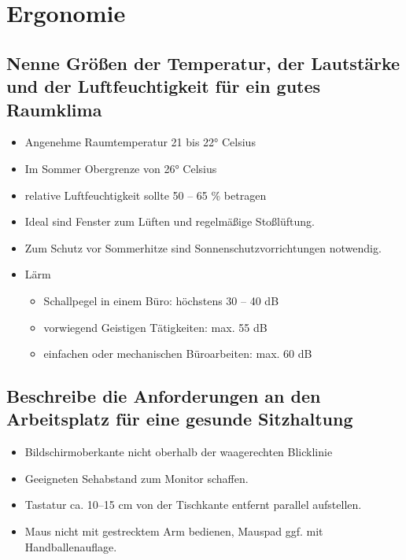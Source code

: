\documentclass[a4paper]{article}
\begin{document}
    \section{Ergonomie}\label{sec:ergonomie}

    \subsection{\color{red}Nenne Größen der Temperatur, der Lautstärke und der Luftfeuchtigkeit für ein gutes Raumklima}\label{subsec:nenne-größen-der-temperatur-der-lautstärke-und-der-luftfeuchtigkeit-für-ein-gutes-raumklima}
    \begin{itemize}
        \color{magenta}
        \item Angenehme Raumtemperatur 21 bis 22° Celsius
        \item Im Sommer Obergrenze von 26° Celsius
        \item relative Luftfeuchtigkeit sollte 50 – 65 \% betragen
        \item Ideal sind Fenster zum Lüften und regelmäßige Stoßlüftung.
        \item Zum Schutz vor Sommerhitze sind Sonnenschutzvorrichtungen notwendig.
        \item \color[HTML]{F56B00} Lärm
        \begin{itemize}
            \item Schallpegel in einem Büro: höchstens 30 – 40 dB
            \item vorwiegend Geistigen Tätigkeiten: max.
            55 dB
            \item einfachen oder mechanischen Büroarbeiten: max.
            60 dB
        \end{itemize}
    \end{itemize}

    \subsection{\color{red}Beschreibe die Anforderungen an den Arbeitsplatz für eine gesunde Sitzhaltung}\label{subsec:beschreibe-die-anforderungen-an-den-arbeitsplatz-für-eine-gesunde-sitzhaltung}
    \begin{itemize}
        \color{magenta}
        \item Bildschirmoberkante nicht oberhalb
        der waagerechten Blicklinie
        \item Geeigneten Sehabstand zum
        Monitor schaffen.
        \item Tastatur ca.
        10--15 cm von
        der Tischkante entfernt parallel
        aufstellen.
        \item Maus nicht mit gestrecktem Arm bedienen, Mauspad ggf.
        mit Handballenauflage.
    \end{itemize}
\end{document}
